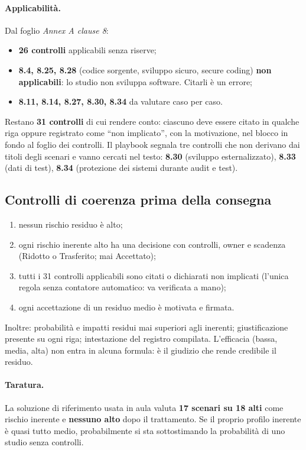 \paragraph{Applicabilità.} Dal foglio \emph{Annex A clause 8}:
\begin{itemize}
  \item \textbf{26 controlli} applicabili senza riserve;
  \item \textbf{8.4, 8.25, 8.28} (codice sorgente, sviluppo sicuro, secure coding) \textbf{non applicabili}:
    lo studio non sviluppa software. Citarli è un errore;
  \item \textbf{8.11, 8.14, 8.27, 8.30, 8.34} da valutare caso per caso.
\end{itemize}
Restano \textbf{31 controlli} di cui rendere conto: ciascuno deve essere citato in qualche riga oppure
registrato come ``non implicato'', con la motivazione, nel blocco in fondo al foglio dei controlli. Il
playbook segnala tre controlli che non derivano dai titoli degli scenari e vanno cercati nel testo:
\textbf{8.30} (sviluppo esternalizzato), \textbf{8.33} (dati di test), \textbf{8.34} (protezione dei
sistemi durante audit e test).

\subsection{Controlli di coerenza prima della consegna}
\begin{enumerate}[label=(\alph*)]
  \item nessun rischio residuo è alto;
  \item ogni rischio inerente alto ha una decisione con controlli, owner e scadenza (Ridotto o
    Trasferito; mai Accettato);
  \item tutti i 31 controlli applicabili sono citati o dichiarati non implicati (l'unica regola senza
    contatore automatico: va verificata a mano);
  \item ogni accettazione di un residuo medio è motivata e firmata.
\end{enumerate}
Inoltre: probabilità e impatti residui mai superiori agli inerenti; giustificazione presente su ogni riga;
intestazione del registro compilata. L'efficacia (bassa, media, alta) non entra in alcuna formula: è il
giudizio che rende credibile il residuo.

\paragraph{Taratura.} La soluzione di riferimento usata in aula valuta \textbf{17 scenari su 18 alti}
come rischio inerente e \textbf{nessuno alto} dopo il trattamento. Se il proprio profilo inerente è
quasi tutto medio, probabilmente si sta sottostimando la probabilità di uno studio senza controlli.

